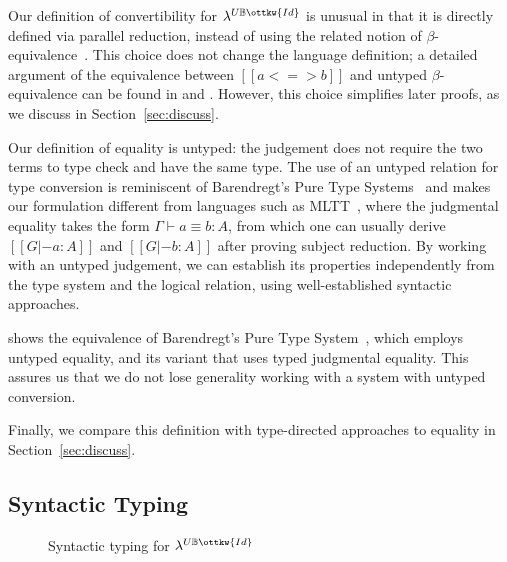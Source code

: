 \documentclass[acmsmall,screen=true,
\ifpublic review=false\else,review=true\fi
  ,anonymous=\ifanonymous true\else false\fi]{acmart}
\newcommand{\lang}{$\lambda^{U\mathbb{B}\ottkw{Id}}$\xspace}
\newcommand{\scw}[1]{}
\newcommand{\yl}[1]{}
\begin{document}
Our definition of convertibility for \lang{} is unusual in that it is directly
defined via parallel reduction, instead of using the related notion of
$\beta$-equivalence~\cite{barendregt:pts,cic}. This choice does not change the
language definition; a detailed argument of the equivalence between
$[[a <=> b]]$ and untyped $\beta$-equivalence can be found in
\citet{barendregt:lambda-calculi-with-types} and
\citet{takahashi-parallel-reduction}. However, this choice simplifies later
proofs, as we discuss in Section~\ref{sec:discuss}. %

Our definition of equality is untyped: the judgement does not require the two
terms to type check and have the same type. The use of an untyped relation for
type conversion is reminiscent of Barendregt's Pure Type
Systems~\citet{barendregt1991introduction} and makes our formulation different
from languages such as MLTT~\citep{Martin-Lof-1973}, where the judgmental
equality takes the form $\Gamma \vdash a \equiv b : A$, from which one can
usually derive $[[G |- a : A]]$ and $[[G |- b : A]]$ after proving subject
reduction. By working with an untyped judgement, we can establish its
properties independently from the type system and the logical relation, using
well-established syntactic approaches.

\citet{siles2012pure} shows the equivalence of Barendregt's Pure Type
System~\citep{barendregt1991introduction}, which employs untyped equality, and
its variant that uses typed judgmental equality. This assures us that we do
not lose generality working with a system with untyped
conversion.
\yl{removed the eta equivalence sentence because it might give the
  wrong message that we extended Siles' work with eta:
 Furthermore, discuss how this definition can be extended with
 $\eta$-equivalence of functions in Section~\ref{XXX} }
Finally, we compare this
definition with type-directed approaches to equality in
Section~\ref{sec:discuss}.


\subsection{Syntactic Typing}

\begin{figure}[h]
\begin{minipage}{0.9\textwidth}
\end{minipage}
\caption{Syntactic typing for \lang}
\label{fig:typing}
\end{figure}
\end{document}
